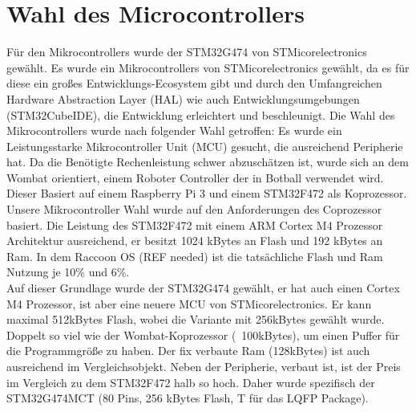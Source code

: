 \chapter{Wahl des Microcontrollers}

Für den Mikrocontrollers wurde der STM32G474\cite{stm32g474} von
STMicorelectronics gewählt. Es wurde ein Mikrocontrollers von STMicorelectronics
gewählt, da es für diese ein großes Entwicklungs-Ecosystem gibt und durch den
Umfangreichen Hardware Abstraction Layer (HAL) wie auch Entwicklungsumgebungen (STM32CubeIDE), die Entwicklung erleichtert und beschleunigt. 
Die Wahl des Mikrocontrollers wurde nach folgender Wahl getroffen: Es wurde ein Leistungsstarke Mikrocontroller Unit (MCU) gesucht, die ausreichend Peripherie hat. Da die Benötigte Rechenleistung schwer abzuschätzen ist, wurde sich an dem Wombat\cite{wombat} orientiert, einem Roboter Controller der in Botball\cite{botball} verwendet wird. Dieser Basiert auf einem Raspberry Pi 3 und einem STM32F472\cite{stm32f427} als Koprozessor. Unsere Mikrocontroller Wahl wurde auf den Anforderungen des Coprozessor basiert. 
Die Leistung des STM32F472 mit einem ARM Cortex M4 Prozessor Architektur
ausreichend, er besitzt 1024 kBytes an Flash und 192 kBytes an Ram. In dem
Raccoon OS (REF needed) ist die tatsächliche Flash und Ram Nutzung je 10\% und 6\%. \\

Auf dieser Grundlage wurde der STM32G474 gewählt, er hat auch einen Cortex M4
Prozessor, ist aber eine neuere MCU von STMicorelectronics. Er kann maximal
512kBytes Flash, wobei die Variante mit 256kBytes gewählt wurde. Doppelt so viel
wie der Wombat-Koprozessor (~100kBytes), um einen Puffer für die Programmgröße
zu haben. Der fix verbaute Ram (128kBytes) ist auch ausreichend im
Vergleichsobjekt. Neben der Peripherie, verbaut ist, ist der Preis im Vergleich
zu dem STM32F472 halb so hoch. Daher wurde spezifisch der STM32G474MCT (80 Pins,
256 kBytes Flash, T für das LQFP Package). 
\\ 
